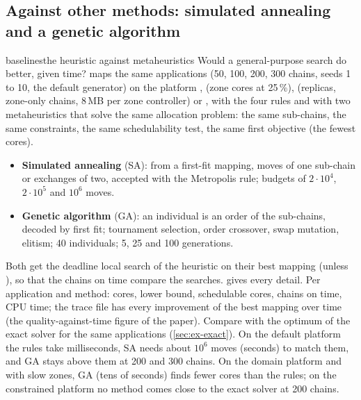 \subsection{Against other methods: simulated annealing and a genetic algorithm}
\label{sec:ex-baselines}

\begin{experimentbox}{baselines}{the heuristic against metaheuristics}
 Would a general-purpose search do better, given time?
  maps the
same applications (50, 100, 200, 300 chains, seeds 1 to 10, the default
generator) on the platform ,  (zone cores at
25\,\%),  (replicas, zone-only chains, 8\,MB per zone
controller) or , with the four rules and with two
metaheuristics that solve the same allocation problem: the same
sub-chains, the same constraints, the same schedulability test, the same
first objective (the fewest cores).
\begin{itemize}
\item \textbf{Simulated annealing} (SA): from a first-fit mapping, moves
of one sub-chain or exchanges of two, accepted with the Metropolis rule;
budgets of $2\cdot10^4$, $2\cdot10^5$ and $10^6$ moves.
\item \textbf{Genetic algorithm} (GA): an individual is an order of the
sub-chains, decoded by first fit; tournament selection, order crossover,
swap mutation, elitism; 40 individuals; 5, 25 and 100 generations.
\end{itemize}
Both get the deadline local search of the heuristic on their best
mapping (unless ), so that the chains on time compare
the searches.  gives every detail.
 Per application and method: cores, lower bound,
schedulable cores, chains on time, CPU time; the trace file has every
improvement of the best mapping over time (the quality-against-time
figure of the paper).
 Compare with the optimum of the exact solver for the
same applications (\cref{sec:ex-exact}). On the default platform the
rules take milliseconds, SA needs about $10^6$ moves (seconds) to match
them, and GA stays above them at 200 and 300 chains. On the domain
platform and with slow zones, GA (tens of seconds) finds fewer cores than
the rules; on the constrained platform no method comes close to the
exact solver at 200 chains.
\end{experimentbox}


